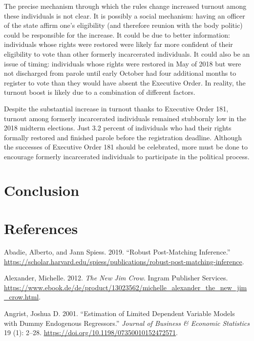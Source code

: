 \documentclass[]{article}
\begin{document}
The precise mechanism through which the rules change increased turnout among these individuals is not clear. It is possibly a social mechanism: having an officer of the state affirm one's eligibility (and therefore reunion with the body politic) could be responsible for the increase. It could be due to better information: individuals whose rights were restored were likely far more confident of their eligibility to vote than other formerly incarcerated individuals. It could also be an issue of timing: individuals whose rights were restored in May of 2018 but were not discharged from parole until early October had four additional months to register to vote than they would have absent the Executive Order. In reality, the turnout boost is likely due to a combination of different factors.

Despite the substantial increase in turnout thanks to Executive Order 181, turnout among formerly incarcerated individuals remained stubbornly low in the 2018 midterm elections. Just 3.2 percent of individuals who had their rights formally restored and finished parole before the registration deadline. Although the successes of Executive Order 181 should be celebrated, more must be done to encourage formerly incarcerated individuals to participate in the political process.

\hypertarget{conclusion}{%
\section{Conclusion}\label{conclusion}}

\newpage

\hypertarget{references}{%
\section*{References}\label{references}}

\hypertarget{refs}{}
\leavevmode\hypertarget{ref-Abadie2019}{}%
Abadie, Alberto, and Jann Spiess. 2019. ``Robust Post-Matching Inference.'' \url{https://scholar.harvard.edu/spiess/publications/robust-post-matching-inference}.

\leavevmode\hypertarget{ref-Alexander2012}{}%
Alexander, Michelle. 2012. \emph{The New Jim Crow}. Ingram Publisher Services. \url{https://www.ebook.de/de/product/13023562/michelle_alexander_the_new_jim_crow.html}.

\leavevmode\hypertarget{ref-Angrist2001}{}%
Angrist, Joshua D. 2001. ``Estimation of Limited Dependent Variable Models with Dummy Endogenous Regressors.'' \emph{Journal of Business \& Economic Statistics} 19 (1): 2--28. \url{https://doi.org/10.1198/07350010152472571}.
\end{document}
